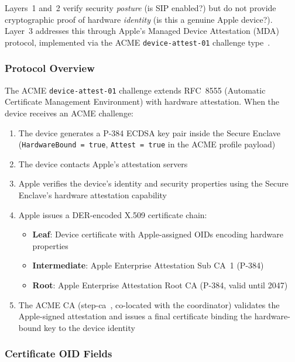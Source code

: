 \documentclass[10pt,twocolumn,letterpaper]{article}
\begin{document}
Layers~1 and~2 verify security \emph{posture} (is SIP enabled?) but do not provide cryptographic proof of hardware \emph{identity} (is this a genuine Apple device?). Layer~3 addresses this through Apple's Managed Device Attestation (MDA) protocol, implemented via the ACME \texttt{device-attest-01} challenge type~\cite{apple-mda}.

\subsubsection{Protocol Overview}

The ACME \texttt{device-attest-01} challenge extends RFC~8555 (Automatic Certificate Management Environment) with hardware attestation. When the device receives an ACME challenge:

\begin{enumerate}[leftmargin=*,itemsep=1pt]
    \item The device generates a P-384 ECDSA key pair inside the Secure Enclave (\texttt{HardwareBound = true}, \texttt{Attest = true} in the ACME profile payload)
    \item The device contacts Apple's attestation servers
    \item Apple verifies the device's identity and security properties using the Secure Enclave's hardware attestation capability
    \item Apple issues a DER-encoded X.509 certificate chain:
    \begin{itemize}[leftmargin=*,itemsep=0pt]
        \item \textbf{Leaf}: Device certificate with Apple-assigned OIDs encoding hardware properties
        \item \textbf{Intermediate}: Apple Enterprise Attestation Sub CA~1 (P-384)
        \item \textbf{Root}: Apple Enterprise Attestation Root CA (P-384, valid until 2047)
    \end{itemize}
    \item The ACME CA (step-ca~\cite{step-ca}, co-located with the coordinator) validates the Apple-signed attestation and issues a final certificate binding the hardware-bound key to the device identity
\end{enumerate}

\subsubsection{Certificate OID Fields}
\end{document}
